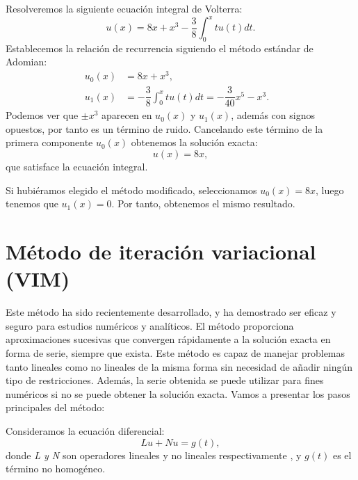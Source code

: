 \begin{ejemplo}
	Resolveremos la siguiente ecuación integral de Volterra:
	\begin{equation}
		u(x) = 8x + x^3 - \dfrac{3}{8} \int_{0}^{x} tu(t)dt.
	\end{equation}
	Establecemos la relación de recurrencia siguiendo el método estándar de Adomian:
	\begin{align}
		u_0(x) &= 8x + x^3,      &   \\
		u_1(x) &= - \dfrac{3}{8} \int_{0}^{x} tu(t)dt = - \dfrac{3}{40}x^5-x^3.    &
	\end{align}
	Podemos ver que $\pm x^3$ aparecen en $u_0(x)$ y $u_1(x)$, además con signos opuestos, por tanto es un término de ruido. Cancelando este término de la primera componente $u_0(x)$ obtenemos la solución exacta:
	\begin{equation}
		u(x) = 8x,
	\end{equation}
	que satisface la ecuación integral.
	\begin{observacion}
		Si hubiéramos elegido el método modificado, seleccionamos $u_0(x) = 8x$, luego tenemos que $u_1(x) = 0$. Por tanto, obtenemos el mismo resultado.
	\end{observacion}
\end{ejemplo}

\section{Método de iteración variacional (VIM)}
Este método ha sido recientemente desarrollado, y ha demostrado ser eficaz y seguro para estudios numéricos y analíticos. El método proporciona aproximaciones sucesivas que convergen rápidamente a la solución exacta en forma de serie, siempre que exista. Este método es capaz de manejar problemas tanto lineales como no lineales de la misma forma sin necesidad de añadir ningún tipo de restricciones. Además, la serie obtenida se puede utilizar para fines numéricos si no se puede obtener la solución exacta. Vamos a presentar los pasos principales del método:

Consideramos la ecuación diferencial:
\begin{equation}\label{eq:miv1}
	Lu + Nu = g(t),
\end{equation}
donde \textit{L y N} son operadores lineales y no lineales respectivamente , y $g(t)$ es el término no homogéneo.


